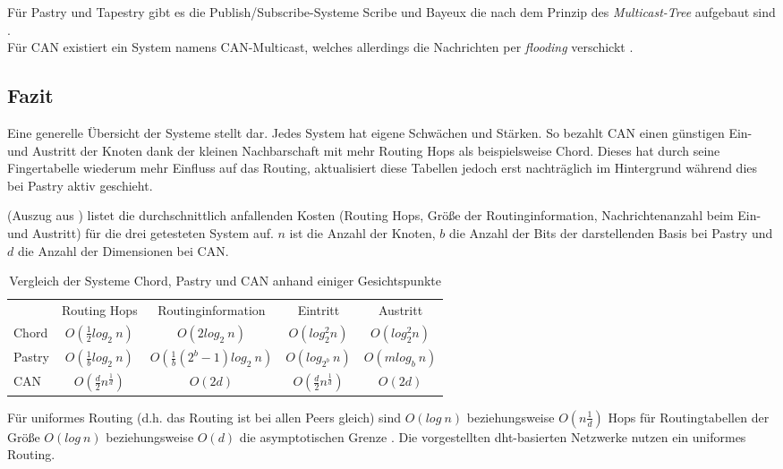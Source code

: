 Für Pastry und Tapestry gibt es die Publish/Subscribe-Systeme Scribe und Bayeux die nach dem Prinzip des \emph{Multicast-Tree} aufgebaut sind \cite{Castro2002Scribe, Zhuang2001}.\\
Für CAN existiert ein System namens CAN-Multicast, welches allerdings die Nachrichten per \emph{flooding} verschickt \cite{Ratnasamy2001}.

\subsection*{Fazit}
Eine generelle Übersicht der Systeme stellt  dar. Jedes System hat eigene Schwächen und Stärken. So bezahlt CAN einen günstigen Ein- und Austritt der Knoten dank der kleinen Nachbarschaft mit mehr Routing Hops als beispielsweise Chord. Dieses hat durch seine Fingertabelle wiederum mehr Einfluss auf das Routing, aktualisiert diese Tabellen jedoch erst nachträglich im Hintergrund während dies bei Pastry aktiv geschieht.

 (Auszug aus \cite{Goetz2005}) listet die durchschnittlich anfallenden Kosten (Routing Hops, Größe der Routinginformation, Nachrichtenanzahl beim Ein- und Austritt) für die drei getesteten System auf. $n$ ist die Anzahl der Knoten, $b$ die Anzahl der Bits der darstellenden Basis bei Pastry und $d$ die Anzahl der Dimensionen bei CAN.

\begin{table}[htbp]
\centering
\label{tab:evaluation_fazit}
\begin{tabular}{lcccc}
\toprule
 & Routing Hops & Routinginformation & Eintritt & Austritt\\ 
 \cmidrule{2-5}
Chord & $O(\frac{1}{2}log_2~n)$ & $O(2log_2~n) $ & $ O(log_2^2 n) $ & $ O(log_2^2 n) $ \\
Pastry & $O(\frac{1}{b}log_2~n)$ & $O(\frac{1}{b} (2^b-1) log_2~n) $ & $ O(log_{2^b}~n) $ & $ O(mlog_b~n) $ \\
CAN & $O(\frac{d}{2}n^\frac{1}{d})	$ & $O(2 d) $ & $ O(\frac{d}{2}n^\frac{1}{d}) $ & $ O(2 d) $ \\
\bottomrule
\end{tabular}
\caption[Vergleich der Systeme Chord, Pastry und CAN]{Vergleich der Systeme Chord, Pastry und CAN anhand einiger Gesichtspunkte}
\end{table}

Für uniformes Routing (d.h. das Routing ist bei allen Peers gleich) sind $O(log~n)$ beziehungsweise $O(n\frac{1}{d})$ Hops für Routingtabellen der Größe $O(log~n)$ beziehungsweise $O(d)$ die asymptotischen Grenze \cite{Xu2004Fundamental}. Die vorgestellten \ac{dht}-basierten Netzwerke nutzen ein uniformes Routing.


